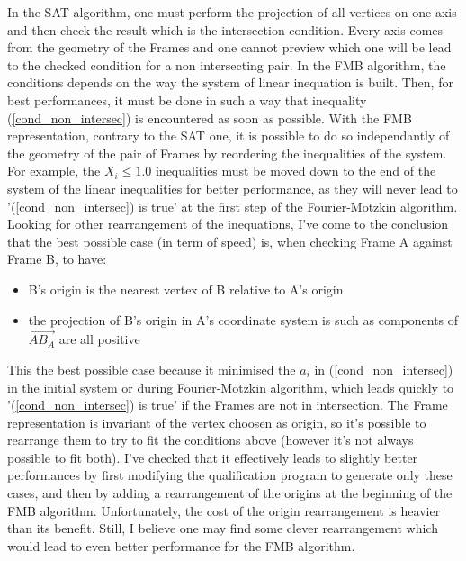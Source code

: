 \documentclass[12pt, a4paper]{article}
\begin{document}
In the SAT algorithm, one must perform the projection of all vertices on one axis and then check the result which is the intersection condition. Every axis comes from the geometry of the Frames and one cannot preview which one will be lead to the checked condition for a non intersecting pair. In the FMB algorithm, the conditions depends on the way the system of linear inequation is built. Then, for best performances, it must be done in such a way that inequality (\ref{cond_non_intersec}) is encountered as soon as possible. With the FMB representation, contrary to the SAT one, it is possible to do so independantly of the geometry of the pair of Frames by reordering the inequalities of the system. For example, the $X_i\le1.0$ inequalities must be moved down to the end of the system of the linear inequalities for better performance, as they will never lead to '(\ref{cond_non_intersec}) is true' at the first step of the Fourier-Motzkin algorithm.\\

Looking for other rearrangement of the inequations, I've come to the conclusion that the best possible case (in term of speed) is, when checking Frame A against Frame B, to have:\\
\begin{itemize}
\item B's origin is the nearest vertex of B relative to A's origin
\item the projection of B's origin in A's coordinate system is such as components of $\overrightarrow{AB_A}$ are all positive
\end{itemize}
This the best possible case because it minimised the $a_i$ in (\ref{cond_non_intersec}) in the initial system or during Fourier-Motzkin algorithm, which leads quickly to '(\ref{cond_non_intersec}) is true' if the Frames are not in intersection. The Frame representation is invariant of the vertex choosen as origin, so it's possible to rearrange them to try to fit the conditions above (however it's not always possible to fit both). I've checked that it effectively leads to slightly better performances by first modifying the qualification program to generate only these cases, and then by adding a rearrangement of the origins at the beginning of the FMB algorithm. Unfortunately, the cost of the origin rearrangement is heavier than its benefit. Still, I believe one may find some clever rearrangement which would lead to even better performance for the FMB algorithm.\\
\end{document}
